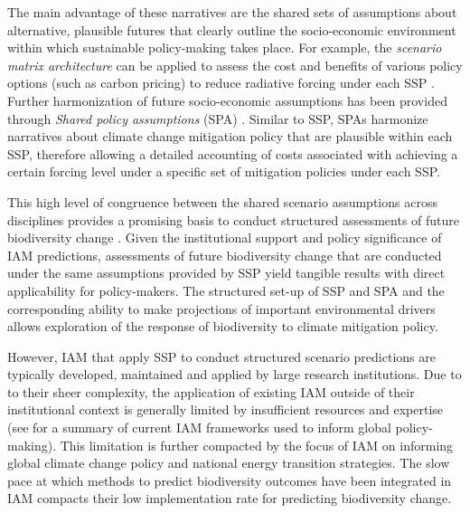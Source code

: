 The main advantage of these narratives are the shared sets of assumptions about alternative, plausible futures that clearly outline the socio-economic environment within which sustainable policy-making takes place. For example, the \textit{scenario matrix architecture} \citep{van_vuuren_new_2014} can be applied to assess the cost and benefits of various policy options (such as carbon pricing) to reduce radiative forcing under each SSP \citep{van_vuuren_new_2014,riahi_shared_2017}. Further harmonization of future socio-economic assumptions has been provided through \textit{Shared policy assumptions} (SPA) \citep{kriegler_new_2014}. Similar to SSP, SPAs harmonize narratives about climate change mitigation policy that are plausible within each SSP, therefore allowing a detailed accounting of costs associated with achieving a certain forcing level under a specific set of mitigation policies under each SSP.

This high level of congruence between the shared scenario assumptions across disciplines provides a promising basis to conduct structured assessments of future biodiversity change \citep{leclere_bending_2020, newbold_global_2015}. Given the institutional support and policy significance of IAM predictions, assessments of future biodiversity change that are conducted under the same assumptions provided by SSP yield tangible results with direct applicability for policy-makers. The structured set-up of SSP and SPA and the corresponding ability to make projections of important environmental drivers allows exploration of the response of biodiversity to climate mitigation policy.

However, IAM that apply SSP to conduct structured scenario predictions are typically developed, maintained and applied by large research institutions. Due to to their sheer complexity, the application of existing IAM outside of their institutional context is generally limited by insufficient resources and expertise (see  for a summary of current IAM frameworks used to inform global policy-making). This limitation is further compacted by the focus of IAM on informing global climate change policy and national energy transition strategies. The slow pace at which methods to predict biodiversity outcomes have been integrated in IAM compacts their low implementation rate for predicting biodiversity change.

